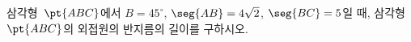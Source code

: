 삼각형~$\pt{ABC}$에서 $B=45^\circ$, $\seg{AB}=4\sqrt{2}$, $\seg{BC}=5$일 때, 삼각형~$\pt{ABC}$의 외접원의 반지름의 길이를 구하시오.

